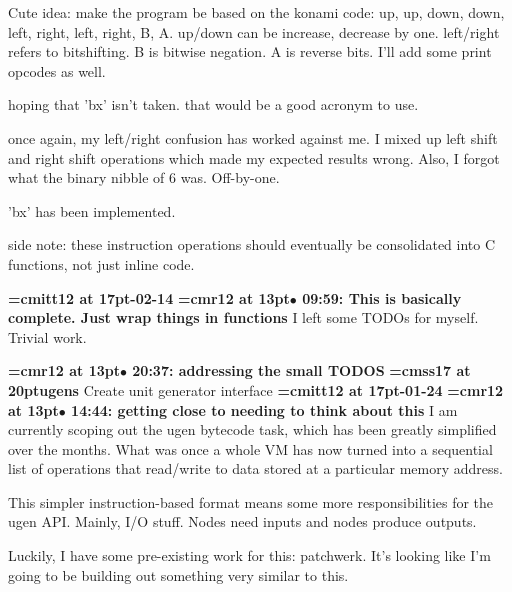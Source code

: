 Cute idea: make the program be based on the konami code: up, up, down, down, left, right, left, right, B, A. up/down can be increase, decrease by one. left/right refers to bitshifting. B is bitwise negation. A is reverse bits. I'll add some print opcodes as well.
\par

hoping that 'bx' isn't taken. that would be a good acronym to use.
\par

once again, my left/right confusion has worked against me. I mixed up left shift and right shift operations which made my expected results wrong. Also, I forgot what the binary nibble of 6 was. Off-by-one.
\par

'bx' has been implemented.
\par

side note: these instruction operations should eventually be consolidated into C functions, not just inline code.
\par

{\medskip\noindent\bf\font\titlefont=cmitt12 at 17pt-02-14}\medskip
{\smallskip\noindent\bf\font\titlefont=cmr12 at 13pt\titlefont $\bullet$ 09:59: This is basically complete. Just wrap things in functions}\smallskip
I left some TODOs for myself. Trivial work.
\par

{\smallskip\noindent\bf\font\titlefont=cmr12 at 13pt\titlefont $\bullet$ 20:37: addressing the small TODOS}\smallskip
{}
{\medskip\noindent\bf\font\titlefont=cmss17 at 20pt\titlefont ugens}\medskip
Create unit generator interface
{\medskip\noindent\bf\font\titlefont=cmitt12 at 17pt-01-24}\medskip
{\smallskip\noindent\bf\font\titlefont=cmr12 at 13pt\titlefont $\bullet$ 14:44: getting close to needing to think about this}\smallskip
I am currently scoping out the ugen bytecode task, which has been greatly simplified over the months. What was once a whole VM has now turned into a sequential list of operations that read/write to data stored at a particular memory address.
\par

This simpler instruction-based format means some more responsibilities for the ugen API. Mainly, I/O stuff. Nodes need inputs and nodes produce outputs.
\par

Luckily, I have some pre-existing work for this: patchwerk. It's looking like I'm going to be building out something very similar to this.
\par

